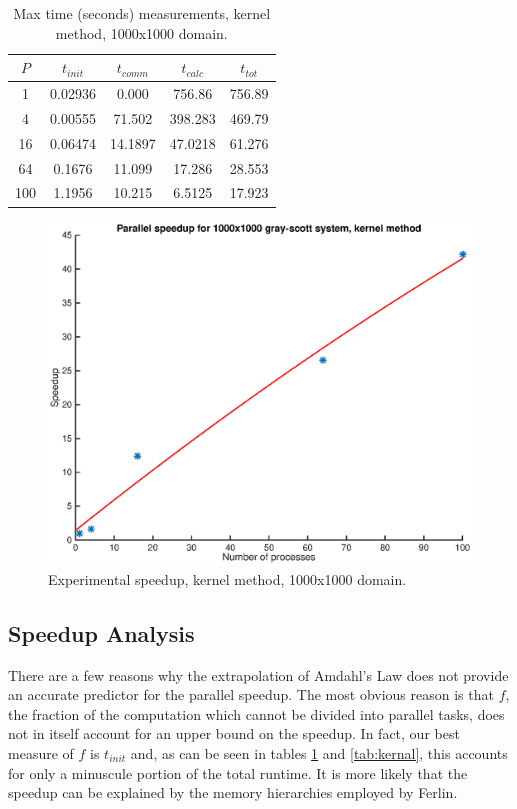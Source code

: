 \documentclass[a4paper,11pt]{article}
\begin{document}
\begin{table}[h]
\def\arraystretch{1.2}
\begin{center}
\caption{Max time (seconds) measurements, kernel method, 1000x1000 domain.}
\label{tab:matrix}
\begin{tabular}{| c | c | c | c | c |}
\hline
$P$ & $t_{init}$ & $t_{comm}$ & $t_{calc}$ & $t_{tot}$ \\
\hline
1 & 0.02936 &  0.000 & 756.86 & 756.89\\
\hline
4 & 0.00555 & 71.502 & 398.283 & 469.79\\
\hline
16 & 0.06474 & 14.1897 & 47.0218 & 61.276\\
\hline
64 & 0.1676 & 11.099 & 17.286 & 28.553\\
\hline
100 & 1.1956 & 10.215 & 6.5125 & 17.923\\
\hline
\end{tabular}
\end{center}
\end{table}

\begin{figure}
  \centering
  \includegraphics[scale=0.6]{kernel-1k}
    \caption{Experimental speedup, kernel method, 1000x1000 domain.}
    \label{fig:kernel-1k}
\end{figure}

\subsection*{Speedup Analysis}
There are a few reasons why the extrapolation of Amdahl's Law does not provide an accurate predictor for the parallel speedup.  The most obvious reason is that $f$, the fraction of the computation which cannot be divided into parallel tasks, does not in itself account for an upper bound on the speedup.  In fact, our best measure of $f$ is $t_{init}$ and, as can be seen in tables \ref{tab:matrix} and \ref{tab:kernal}, this accounts for only a minuscule portion of the total runtime.  It is more likely that the speedup can be explained by the memory hierarchies employed by Ferlin.  
\end{document}
